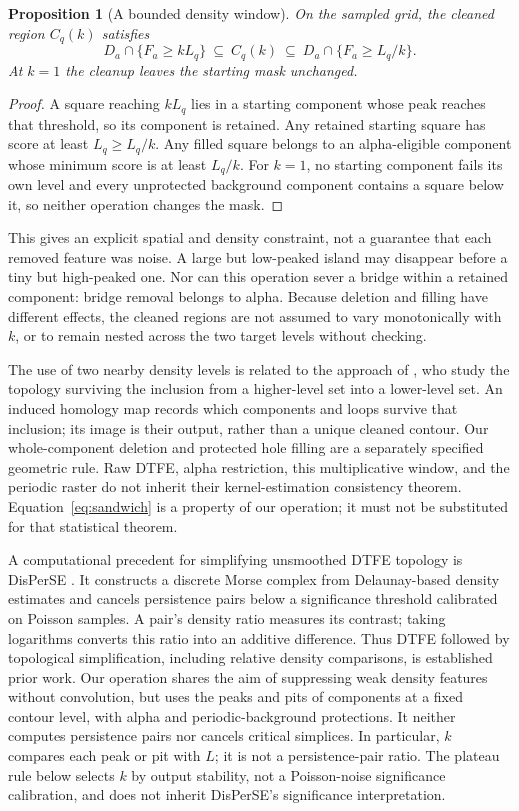 \documentclass[11pt]{article}
\newtheorem{proposition}{Proposition}
\begin{document}
\begin{proposition}[A bounded density window]
On the sampled grid, the cleaned region $C_q(k)$ satisfies
\begin{equation}
 D_a\cap\{F_a\geq kL_q\}\ \subseteq\ C_q(k)\
 \subseteq\ D_a\cap\{F_a\geq L_q/k\}.
 \label{eq:sandwich}
\end{equation}
At $k=1$ the cleanup leaves the starting mask unchanged.
\end{proposition}
\begin{proof}
A square reaching $kL_q$ lies in a starting component whose peak reaches
that threshold, so its component is retained. Any retained starting square
has score at least $L_q\geq L_q/k$. Any filled square belongs to an
alpha-eligible component whose minimum score is at least $L_q/k$.
For $k=1$, no starting component fails its own level and every unprotected
background component contains a square below it, so neither operation
changes the mask.
\end{proof}

This gives an explicit spatial and density constraint, not a guarantee
that each removed feature was noise. A large but low-peaked island may
disappear before a tiny but high-peaked one. Nor can this operation sever
a bridge within a retained component: bridge removal belongs to alpha.
Because deletion and filling have different effects, the cleaned regions
are not assumed to vary monotonically with $k$, or to remain nested across
the two target levels without checking.

The use of two nearby density levels is related to the approach of
\citet{bobrowski2017}, who study the topology surviving the inclusion from
a higher-level set into a lower-level set. An induced homology map records which components and loops survive
that inclusion; its image is their output, rather than a unique cleaned contour. Our whole-component
deletion and protected hole filling are a separately specified geometric
rule. Raw DTFE, alpha restriction, this multiplicative window, and the
periodic raster do not inherit their kernel-estimation consistency theorem.
Equation~\eqref{eq:sandwich} is a property of our operation; it must not be
substituted for that statistical theorem.

A computational precedent for simplifying unsmoothed DTFE topology is
DisPerSE \citep{sousbie2011}. It constructs a discrete Morse complex from
Delaunay-based density estimates and cancels persistence pairs below a
significance threshold calibrated on Poisson samples. A pair's density
ratio measures its contrast; taking logarithms converts this ratio into
an additive difference. Thus DTFE followed by topological simplification,
including relative density comparisons, is established prior work.
Our operation shares the aim of suppressing weak density features without
convolution, but uses the peaks and pits of components at a fixed contour
level, with alpha and periodic-background protections. It neither computes
persistence pairs nor cancels critical simplices. In particular, $k$
compares each peak or pit with $L$; it is not a persistence-pair ratio.
The plateau rule below selects $k$ by output stability, not a Poisson-noise
significance calibration, and does not inherit DisPerSE's significance
interpretation.
\end{document}
